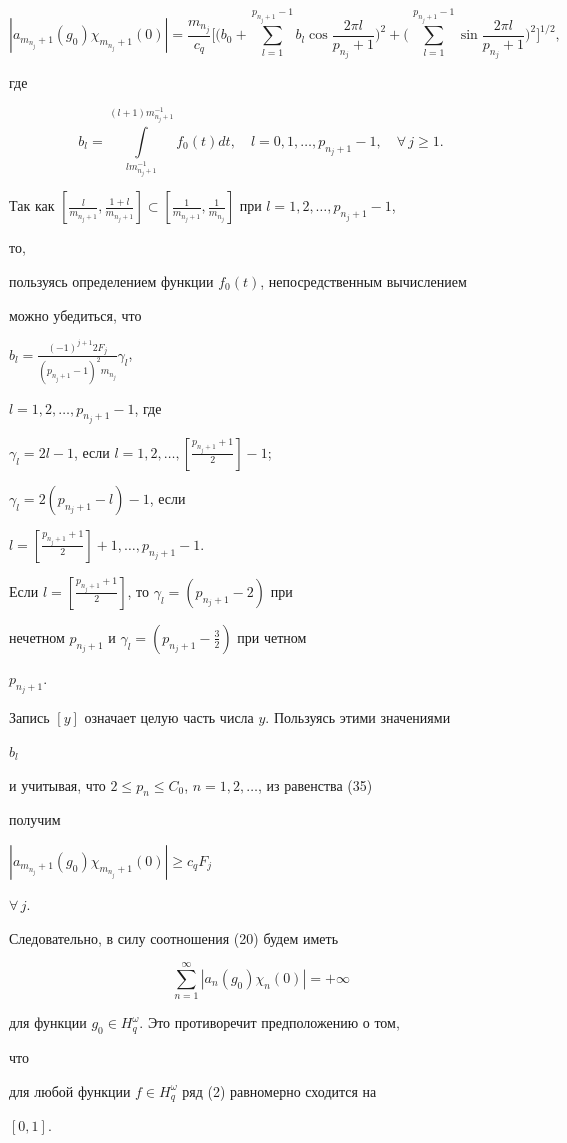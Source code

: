 \begin{pf}
\begin{equation}
|a_{m_{n_j}+1}(g_0)\chi_{m_{n_j}+1}(0)|= 


\frac{m_{n_j}}{c_q}\bigg[\bigg(b_0+ 


\sum^{p_{n_j+1}-1}_{l=1}b_l\cos\frac{2\pi l}{p_{n_j}+1} 


\bigg)^2+\bigg(\,\sum^{p_{n_j+1}-1}_{l=1} 


\sin\frac{2\pi l}{p_{n_j}+1}\bigg)^2\bigg]^{1/2}, 


\end{equation} 


где 


$$ 


b_l=\int\limits^{(l+1)m^{-1}_{n_j+1}}_{l m^{-1}_{n_j+1}} 


f_0(t)dt,\quad l=0,1,\dotsc,p_{n_j+1}-1,\quad 


\forall\,j\ge 1. 


$$ 


Так как $[\frac{l}{m_{n_j+1}},\frac{1+l}{m_{n_j+1}}]\subset 


[\frac{1}{m_{n_j+1}},\frac{1}{m_{n_j}}]$ при $l=1,2,\dotsc,p_{n_j+1}-1$, 


то, 


пользуясь определением функции $f_0(t)$, непосредственным вычислением 


можно убедиться, что 


$b_l=\frac{(-1)^{j+1}2F_j}{(p_{n_j+1}-1)^2m_{n_j}}\gamma_l$, 


$l=1,2,\dotsc,p_{n_j+1}-1$, где 


$\gamma_l=2l-1$, если $l=1,2,\dotsc,[\frac{p_{n_j+1}+1}{2}]-1$; 


$\gamma_l=2(p_{n_j+1}-l)-1$, если 


$l=[\frac{p_{n_j+1}+1}{2}]+1,\dotsc,p_{n_j+1}-1$. 


Если $l=[\frac{p_{n_j+1}+1}{2}]$, то $\gamma_l=(p_{n_j+1}-2)$ при 


нечетном $p_{n_j+1}$ и $\gamma_l=(p_{n_j+1}-\frac{3}{2})$ при четном 


$p_{n_j+1}$. 


Запись $[y]$ означает целую часть числа $y$. Пользуясь этими значениями 


$b_l$ 


и учитывая, что $2\le p_n\le C_0$, $n=1,2,\dotsc$, из равенства (35) 


получим 


$|a_{m_{n_j}+1}(g_0)\chi_{m_{n_j}+1}(0)|\ge c_q F_j$


$\forall\,j$. 


Следовательно, в силу соотношения (20) будем иметь 


$$ 


\sum^\infty_{n=1}|a_n(g_0)\chi_n(0)|=+\infty 


$$ 


для функции $g_0\in H^\omega_q$. Это противоречит предположению о том, 


что 


для любой функции $f\in H^\omega_q$ ряд (2) равномерно сходится на 


$[0,1]$. 


\end{pf} 



